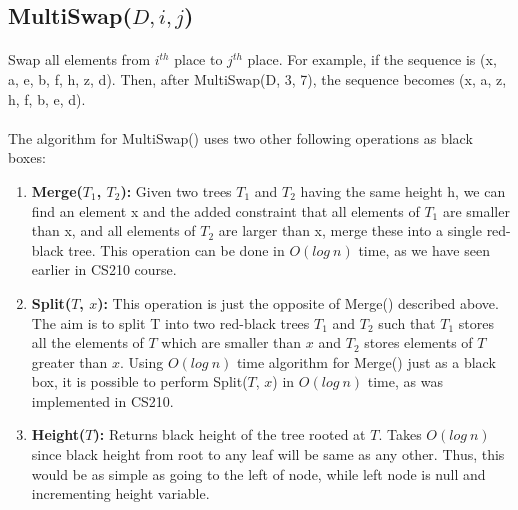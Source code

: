 \documentclass[pdftex,a4paper,12pt]{report}
\begin{document}
\newpage
\subsection{MultiSwap($D, i, j$)}
\paragraph{} Swap all elements from $ i^{th} $ place to $ j^{th} $ place. For example, if the sequence is
(x, a, e, b, f, h, z, d). Then, after MultiSwap(D, 3, 7), the sequence becomes (x, a, z, h, f, b, e, d).

\paragraph{}
The algorithm for MultiSwap() uses two other following operations as black boxes:
\begin{enumerate}

	\item \textbf{Merge($T_1$, $T_2$):} Given two trees $T_1$ and $T_2$ having the same height h, we can find an element x
	and the added constraint that all elements of $T_1$ are smaller than x, and all elements of $T_2$ are larger than x, merge these into 
	a single red-black tree. This operation can be done in $O(log\ n)$ time, as we have seen earlier in CS210 course.

	\item \textbf{Split($T$, $x$):} This operation is just the opposite of Merge() described above. The aim is to split 
	T into two red-black trees $T_1$ and $T_2$ such that $T_1$ stores all the elements of $T$ which are smaller 
	than $x$ and $T_2$ stores elements of $T$ greater than $x$. Using $O(log\ n)$ time algorithm for Merge() just 
	as a black box, it is possible to perform Split($T$, $x$) in $O(log\ n)$ time, as was implemented in CS210.
	
	\item \textbf{Height($T$):} Returns black height of the tree rooted at $T$. Takes $O(log\ n)$ since black height from 
	root to any leaf will be same as any other. Thus, this would be as simple as going to the left of node, while left
	node is null and incrementing height variable.
\end{enumerate}
\end{document}
